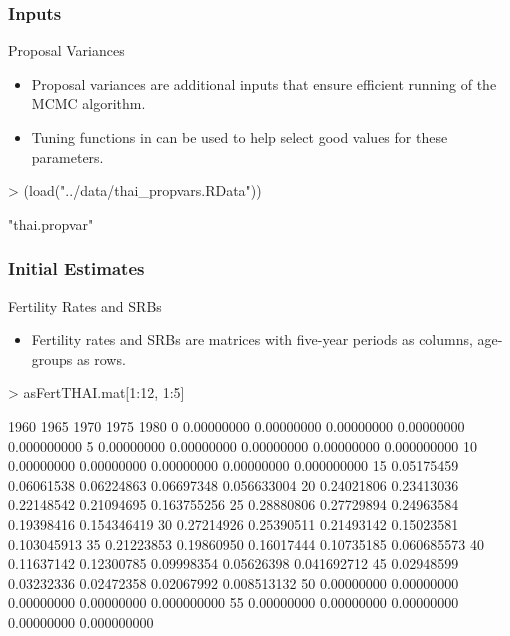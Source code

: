 \documentclass[smaller,compress,table]{beamer}
\begin{document}
\begin{frame}[fragile]
  \frametitle{Inputs}
  \begin{block}{Proposal Variances}
  \begin{itemize}
      \item Proposal variances are additional inputs that ensure efficient running of the MCMC algorithm.
      \item Tuning functions in  can be used to help select good values for these parameters.
  \end{itemize}

\begin{Schunk}
\begin{Sinput}
> (load("../data/thai_propvars.RData"))
\end{Sinput}
\begin{Soutput}
[1] "thai.propvar"
\end{Soutput}
\end{Schunk}

\end{block}
\end{frame}


\begin{frame}[fragile]
  \frametitle{Initial Estimates}
  \begin{block}{Fertility Rates and SRBs}
  \begin{itemize}
      \item Fertility rates and SRBs are matrices with five-year periods as columns, age-groups as rows.
  \end{itemize}

\begin{Schunk}
\begin{Sinput}
> asFertTHAI.mat[1:12, 1:5]
\end{Sinput}
\begin{Soutput}
         1960       1965       1970       1975        1980
0  0.00000000 0.00000000 0.00000000 0.00000000 0.000000000
5  0.00000000 0.00000000 0.00000000 0.00000000 0.000000000
10 0.00000000 0.00000000 0.00000000 0.00000000 0.000000000
15 0.05175459 0.06061538 0.06224863 0.06697348 0.056633004
20 0.24021806 0.23413036 0.22148542 0.21094695 0.163755256
25 0.28880806 0.27729894 0.24963584 0.19398416 0.154346419
30 0.27214926 0.25390511 0.21493142 0.15023581 0.103045913
35 0.21223853 0.19860950 0.16017444 0.10735185 0.060685573
40 0.11637142 0.12300785 0.09998354 0.05626398 0.041692712
45 0.02948599 0.03232336 0.02472358 0.02067992 0.008513132
50 0.00000000 0.00000000 0.00000000 0.00000000 0.000000000
55 0.00000000 0.00000000 0.00000000 0.00000000 0.000000000
\end{Soutput}
\end{Schunk}

\end{block}
\end{frame}
\end{document}
